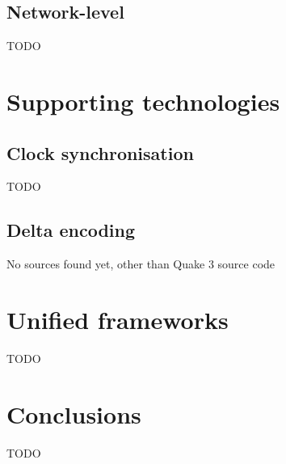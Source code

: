 \documentclass[conference]{IEEEtran}
\begin{document}
	\subsection{Network-level}

	TODO \cite{yu2008latency} \cite{yu2012latency}

	\section{Supporting technologies}

	\subsection{Clock synchronisation}

	TODO \cite{cristian1989probabilistic}

	\subsection{Delta encoding}

	No sources found yet, other than Quake 3 source code

	\section{Unified frameworks}

	TODO \cite{savery2013timelines} \cite{touch1992mirage} \cite{diot1999distributed}

	\section{Conclusions}

	TODO

	\printbibliography
\end{document}
